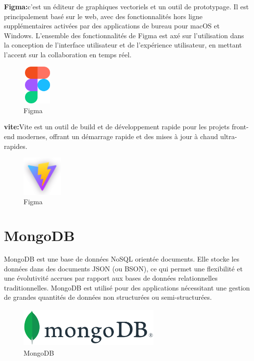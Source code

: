 \documentclass[edit,12pt,a4paper,ChapStyle,oneside,doubleinterligne]{report}
\begin{document}
\textbf{Figma:}c'est un éditeur de graphiques vectoriels et un outil de prototypage. Il est principalement basé sur le web, avec des fonctionnalités hors ligne supplémentaires activées par des applications de bureau pour macOS et Windows. L'ensemble des fonctionnalités de Figma est axé sur l'utilisation dans la conception de l'interface utilisateur et de l'expérience utilisateur, en mettant l'accent sur la collaboration en temps réel. \cite{figma}
  \begin{figure}[H] 
    \centering
    \includegraphics[width=1.5cm , height = 2cm , angle=360]{images/figma.png}
    \caption{Figma}
    \label{fig:figma}
\end{figure}
\textbf{vite:}Vite est un outil de build et de développement rapide pour les projets front-end modernes, offrant un démarrage rapide et des mises à jour à chaud ultra-rapides.
\begin{figure}[H] 
    \centering
    \includegraphics[width=2cm , height = 2cm , angle=360]{images/logo-with-shadow.png}
    \caption{Figma}
    \label{fig:figma}
\end{figure}
\section{MongoDB} MongoDB est une base de données NoSQL orientée documents. Elle stocke les données dans des documents JSON (ou BSON), ce qui permet une flexibilité et une évolutivité accrues par rapport aux bases de données relationnelles traditionnelles. MongoDB est utilisé pour des applications nécessitant une gestion de grandes quantités de données non structurées ou semi-structurées.
\begin{figure}[H] 
    \centering
    \includegraphics[width=7cm , height = 2cm , angle=360]{images/mongodb.png}
    \caption{MongoDB}
    \label{fig:MongoDB}
\end{figure}
\end{document}
